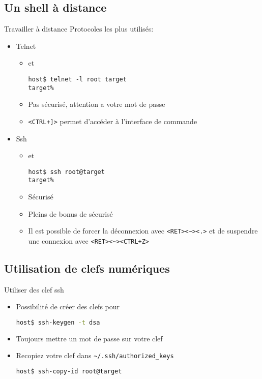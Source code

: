 \subsection{Un shell à distance}

\begin{frame}[fragile=singleslide]{Travailler à distance}
  Protocoles les plus utilisés:
  \begin{itemize}
  \item Telnet
    \begin{itemize}
    \item {} et 
\begin{lstlisting}
host$ telnet -l root target
target%
\end{lstlisting} %
    \item   Pas   sécurisé,   attention   a   votre   mot   de   passe
    \item \verb/<CTRL+]>/ permet d'accéder à l'interface de commande
    \end{itemize}
  \item Ssh
    \begin{itemize}
    \item {} et 
\begin{lstlisting}
host$ ssh root@target
target%
\end{lstlisting} %
    \item Sécurisé
    \item Pleins de bonus de sécurisé
    \item   Il   est   possible   de  forcer   la   déconnexion   avec
      \verb/<RET><~><.>/   et   de   suspendre  une   connexion   avec
      \verb/<RET><~><CTRL+Z>/
    \end{itemize}
  \end{itemize}
\end{frame}

\subsection{Utilisation de clefs numériques}

\begin{frame}[fragile=singleslide]{Utiliser des clef ssh}
  \begin{itemize}
  \item Possibilité de créer des clefs pour 
\begin{lstlisting}[language=sh]
host$ ssh-keygen -t dsa
\end{lstlisting} %
  \item Toujours mettre un mot de passe sur votre clef
  \item Recopiez votre clef dans \verb+~/.ssh/authorized_keys+
\begin{lstlisting}[language=sh]
host$ ssh-copy-id root@target
\end{lstlisting} %
  \end{itemize}
\end{frame}

